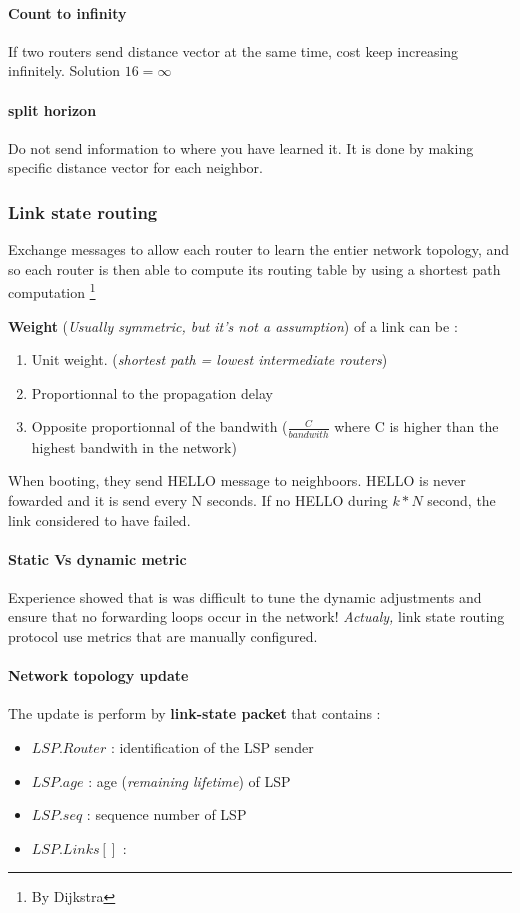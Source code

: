 \paragraph{Count to infinity} If two routers send distance vector at the same time, cost keep increasing 
infinitely. Solution $16=\infty$
\paragraph{split horizon} Do not send information to where you have learned it. It is done by making 
specific distance vector for each neighbor.
\subsubsection{Link state routing}
Exchange messages to allow each router to learn the entier network topology, and so
each router is then able to compute its routing table by using a shortest path computation
\footnote{By Dijkstra}

\textbf{Weight} (\textit{Usually symmetric, but it's not a assumption}) of a link can be :
\begin{enumerate}
    \item Unit weight. (\textit{shortest path = lowest intermediate routers})
    \item Proportionnal to the propagation delay
    \item Opposite proportionnal of the bandwith ($\frac{C}{bandwith}$ where C is
    higher than the highest bandwith in the network)
\end{enumerate}
When booting, they send HELLO message to neighboors. HELLO is never fowarded and it is send every N 
seconds. If no HELLO during $k*N$ second, the link considered to have failed.
\paragraph{Static Vs dynamic metric} Experience showed that is was difficult
to tune the dynamic adjustments and ensure that no forwarding loops occur in
the network! \textit{Actualy,} link state routing protocol use metrics
that are manually configured.

\paragraph{Network topology update}
The update is perform by \textbf{link-state packet} that contains :
\begin{itemize}
    \item $LSP.Router$ : identification of the LSP sender
    \item $LSP.age$ : age (\textit{remaining lifetime}) of LSP
    \item $LSP.seq$ : sequence number of LSP
    \item $LSP.Links[]$ : 
\end{itemize}

